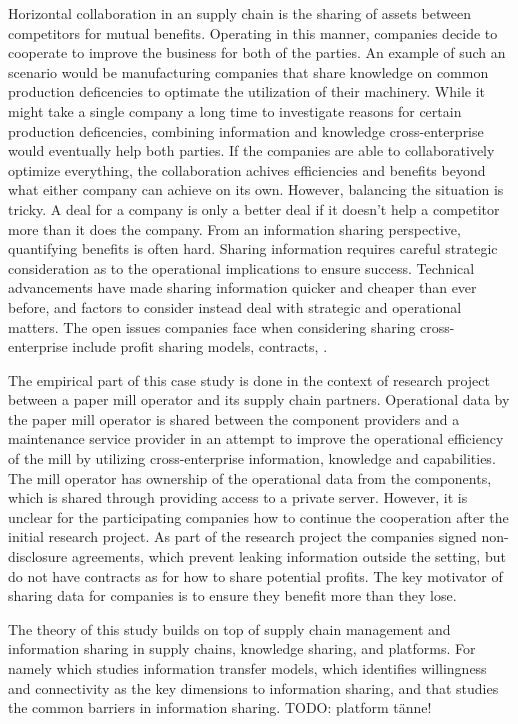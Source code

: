 Horizontal collaboration in an supply chain \cite{} is the sharing of assets between competitors for mutual benefits. Operating in this manner, companies decide to cooperate to improve the business for both of the parties. An example of such an scenario would be manufacturing companies that share knowledge on common production deficencies to optimate the utilization of their machinery. While it might take a single company a long time to investigate reasons for certain production deficencies, combining information and knowledge cross-enterprise would eventually help both parties. If the companies are able to collaboratively optimize everything, the collaboration achives efficiencies and benefits beyond what either company can achieve on its own. However, balancing the situation is tricky. A deal for a company is only a better deal if it doesn't help a competitor more than it does the company. From an information sharing perspective, quantifying benefits is often hard. Sharing information requires careful strategic consideration as to the operational implications to ensure success. Technical advancements have made sharing information quicker and cheaper than ever before, and factors to consider instead deal with strategic and operational matters. The open issues companies face when considering sharing cross-enterprise include profit sharing models, contracts,  \cite{}. 

The empirical part of this case study is done in the context of research project between a paper mill operator and its supply chain partners. Operational data by the paper mill operator is shared between the component providers and a maintenance service provider in an attempt to improve the operational efficiency of the mill by utilizing cross-enterprise information, knowledge and capabilities. The mill operator has ownership of the operational data from the components, which is shared through providing access to a private server. However, it is unclear for the participating companies how to continue the cooperation after the initial research project. As part of the research project the companies signed non-disclosure agreements, which prevent leaking information outside the setting, but do not have contracts as for how to share potential profits. The key motivator of sharing data for companies is to ensure they benefit more than they lose.

The theory of this study builds on top of supply chain management and information sharing in supply chains, knowledge sharing, and platforms. For namely \cite{lee2000information} which studies information transfer models, \cite{croom2007information} which identifies willingness and connectivity as the key dimensions to information sharing, and \cite{} that studies the common barriers in information sharing. TODO: platform tänne!


